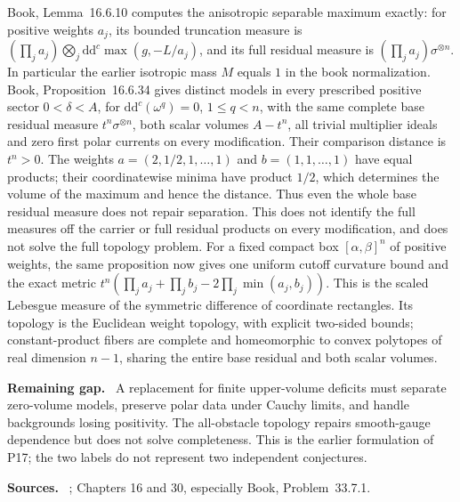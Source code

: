 \documentclass[11pt]{article}
\newcommand{\ddc}{\mathrm d\mathrm d^c}
\newcommand{\field}[1]{\par\medskip\noindent\textbf{#1.}\ }
\begin{document}
Book, Lemma~16.6.10 computes the anisotropic separable maximum exactly: for positive weights $a_j$, its bounded truncation measure is $(\prod_j a_j)\bigotimes_j\ddc\max(g,-L/a_j)$, and its full residual measure is $(\prod_j a_j)\sigma^{\otimes n}$. In particular the earlier isotropic mass $M$ equals $1$ in the book normalization. Book, Proposition~16.6.34 gives distinct models in every prescribed positive sector $0<\delta<A$, for $\ddc(\omega^q)=0$, $1\leq q<n$, with the same complete base residual measure $t^n\sigma^{\otimes n}$, both scalar volumes $A-t^n$, all trivial multiplier ideals and zero first polar currents on every modification. Their comparison distance is $t^n>0$. The weights $a=(2,1/2,1,\ldots,1)$ and $b=(1,1,\ldots,1)$ have equal products; their coordinatewise minima have product $1/2$, which determines the volume of the maximum and hence the distance. Thus even the whole base residual measure does not repair separation. This does not identify the full measures off the carrier or full residual products on every modification, and does not solve the full topology problem. For a fixed compact box $[\alpha,\beta]^n$ of positive weights, the same proposition now gives one uniform cutoff curvature bound and the exact metric $t^n(\prod_j a_j+\prod_j b_j-2\prod_j\min(a_j,b_j))$. This is the scaled Lebesgue measure of the symmetric difference of coordinate rectangles. Its topology is the Euclidean weight topology, with explicit two-sided bounds; constant-product fibers are complete and homeomorphic to convex polytopes of real dimension $n-1$, sharing the entire base residual and both scalar volumes.
\field{Remaining gap} A replacement for finite upper-volume deficits must separate zero-volume models, preserve polar data under Cauchy limits, and handle backgrounds losing positivity. The all-obstacle topology repairs smooth-gauge dependence but does not solve completeness. This is the earlier formulation of P17; the two labels do not represent two independent conjectures.
\field{Sources} \cite{SGPT,XL26}; Chapters 16 and 30, especially Book, Problem~33.7.1.
\end{document}
